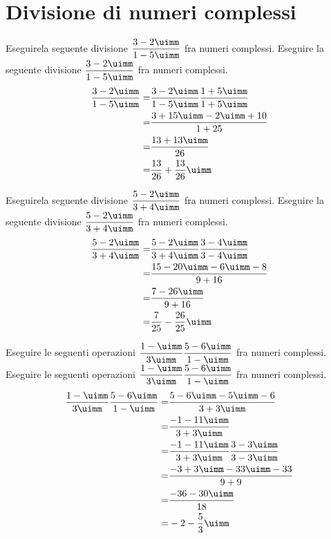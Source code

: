  \section{Divisione di  numeri complessi}
 \begin{exercise}
Eseguirela seguente divisione $\dfrac{3-2\uimm}{1-5\uimm}$ fra numeri complessi.
\tcblower
Eseguire la seguente divisione  $\dfrac{3-2\uimm}{1-5\uimm}$ fra numeri complessi.
\begin{align*}
\dfrac{3-2\uimm}{1-5\uimm}=&\dfrac{3-2\uimm}{1-5\uimm}\dfrac{1+5\uimm}{1+5\uimm}\\
=&\dfrac{3+15\uimm-2\uimm+10}{1+25}\\
=&\dfrac{13+13\uimm}{26}\\
=&\dfrac{13}{26}+\dfrac{13}{26}\uimm\\
\end{align*}
 \end{exercise}
 \begin{exercise}
	Eseguirela seguente divisione $\dfrac{5-2\uimm}{3+4\uimm}$ fra numeri complessi.
	\tcblower
	Eseguire la seguente divisione  $\dfrac{5-2\uimm}{3+4\uimm}$ fra numeri complessi.
	\begin{align*}
	\dfrac{5-2\uimm}{3+4\uimm}=&\dfrac{5-2\uimm}{3+4\uimm}\dfrac{3-4\uimm}{3-4\uimm}\\
	=&\dfrac{15-20\uimm-6\uimm-8}{9+16}\\
	=&\dfrac{7-26\uimm}{9+16}\\
	=&\dfrac{7}{25}-\dfrac{26}{25}\uimm\\
	\end{align*}
\end{exercise}
 \begin{exercise}
	Eseguire le seguenti operazioni  $\dfrac{1-\uimm}{3\uimm}\dfrac{5-6\uimm}{1-\uimm}$ fra numeri complessi.
	\tcblower
	Eseguire le seguenti operazioni  $\dfrac{1-\uimm}{3\uimm}\dfrac{5-6\uimm}{1-\uimm}$ fra numeri complessi.
	\begin{align*}
	\dfrac{1-\uimm}{3\uimm}\dfrac{5-6\uimm}{1-\uimm}=&\dfrac{5-6\uimm-5\uimm-6}{3+3\uimm}\\
	=&\dfrac{-1-11\uimm}{3+3\uimm}\\
	=&\dfrac{-1-11\uimm}{3+3\uimm}\dfrac{3-3\uimm}{3-3\uimm}\\
	=&\dfrac{-3+3\uimm-33\uimm-33}{9+9}\\
	=&\dfrac{-36-30\uimm}{18}\\
	=&-2-\dfrac{5}{3}\uimm
	\end{align*}
\end{exercise}

 